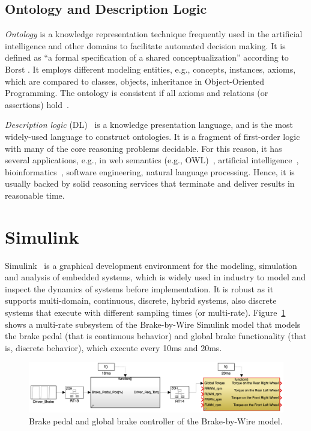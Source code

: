 \subsection*{Ontology and Description Logic}
\textit{Ontology} is a knowledge representation technique frequently used in the artificial intelligence and other domains to facilitate automated decision making. It is defined as ``a formal specification of a shared conceptualization'' according to Borst \cite{Borst1997ConstructionOntologies}. It employs different modeling entities, e.g., concepts, instances, axioms, which are compared to classes, objects, inheritance in Object-Oriented Programming. The ontology is consistent if all axioms and relations (or assertions) hold~\cite{Mankovskii2009OWL:Language}.

\textit{Description logic} (DL)~\cite{Baader2010TheApplications} is a knowledge presentation language, and is the most widely-used language to construct ontologies. It is a fragment of first-order logic with many of the core reasoning problems decidable. For this reason, it has several applications, e.g., in web semantics (e.g., OWL)~\cite{conf/owled/ShearerMH08}, artificial intelligence~\cite{10.1007/978-94-017-9297-4_7}, bioinformatics~\cite{Rector2006}, software engineering, natural language processing. Hence, it is usually backed by solid reasoning services that terminate and deliver results in reasonable time. 

\section{Simulink}
Simulink~\cite{JamesB.Dabney2003MasteringSimulink} is a graphical development environment for the modeling, simulation and analysis of embedded systems, which is widely used in industry to model and inspect the dynamics of systems before implementation. It is robust as it supports multi-domain, continuous, discrete, hybrid systems, also discrete systems that execute with different sampling times (or multi-rate). Figure~\ref{fig_sm_multi-rate} shows a multi-rate subsystem of the Brake-by-Wire Simulink model that models the brake pedal (that is continuous behavior) and global brake functionality (that is, discrete behavior), which execute every 10ms and 20ms.  
\begin{figure}[h]
	\centering
	\includegraphics[width=0.9\linewidth]{images/sm}
	\caption{Brake pedal and global brake controller of the Brake-by-Wire model.}
	\label{fig_sm_multi-rate}
\end{figure}

